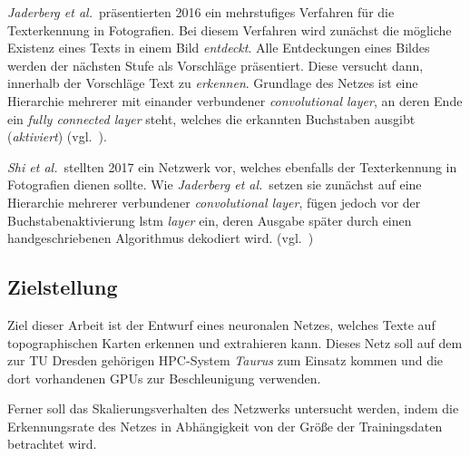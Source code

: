 \textit{Jaderberg et al.}\ präsentierten 2016 ein mehrstufiges Verfahren für die Texterkennung in Fotografien. Bei
diesem Verfahren wird zunächst die mögliche Existenz eines Texts in einem Bild \textit{entdeckt}. Alle Entdeckungen
eines Bildes werden der nächsten Stufe als Vorschläge präsentiert. Diese versucht dann, innerhalb der Vorschläge Text zu
\textit{erkennen}. Grundlage des Netzes ist eine Hierarchie mehrerer mit einander verbundener
\textit{convolutional layer}, an deren Ende ein \textit{fully connected layer} steht, welches die erkannten Buchstaben
ausgibt (\textit{aktiviert}) (vgl.~\cite{jaderberg2016}).

\textit{Shi et al.}\ stellten 2017 ein Netzwerk vor, welches ebenfalls der Texterkennung in Fotografien dienen sollte.
Wie \textit{Jaderberg et al.}\ setzen sie zunächst auf eine Hierarchie mehrerer verbundener
\textit{convolutional layer}, fügen jedoch vor der Buchstabenaktivierung \gls{lstm} \textit{layer} ein, deren Ausgabe
später durch einen handgeschriebenen Algorithmus dekodiert wird. (vgl.~\cite{shi2017})

\subsection{Zielstellung}
\label{einleitung:zielstellung}

Ziel dieser Arbeit ist der Entwurf eines neuronalen Netzes, welches Texte auf topographischen Karten erkennen und
extrahieren kann. Dieses Netz soll auf dem zur TU Dresden gehörigen HPC-System \textit{Taurus} zum Einsatz kommen und
die dort vorhandenen GPUs zur Beschleunigung verwenden.

Ferner soll das Skalierungsverhalten des Netzwerks untersucht werden, indem die Erkennungsrate des Netzes in
Abhängigkeit von der Größe der Trainingsdaten betrachtet wird.
